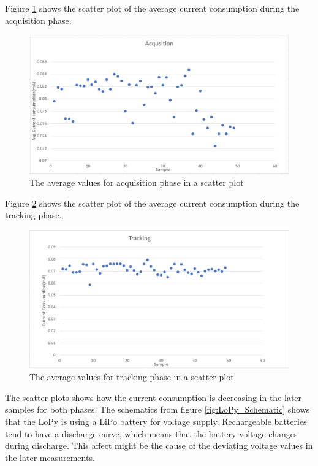 Figure \ref{fig:averageacq} shows the scatter plot of the average current consumption during the acquisition phase. 
 
\begin{figure}[H]
\centering
\includegraphics[width=15 cm]{Project_Report/Images/AcqusitionData.PNG}
\caption{The average values for acquisition phase in a scatter plot }
\label{fig:averageacq}
\end{figure}

Figure \ref{fig:averagetrack} shows the scatter plot of the average current consumption during the tracking phase.

\begin{figure}[H]
\centering
\includegraphics[width=15 cm]{Project_Report/Images/trackingData.PNG}
\caption{The average values for tracking phase in a scatter plot }
\label{fig:averagetrack}
\end{figure}
 
The scatter plots shows how the current consumption is decreasing in the later samples for both phases. The schematics from figure \ref{fig:LoPy_Schematic} shows that the LoPy is using a LiPo battery for voltage supply. Rechargeable batteries  tend to have a discharge curve, which means that the battery voltage changes during discharge. This affect might be the cause of the deviating voltage values in the later measurements. 

